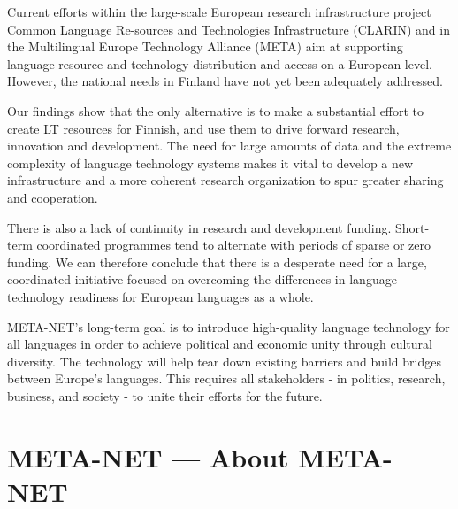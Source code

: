 \documentclass[]{../../metanetpaper}
\begin{document}
\begin{Parallel}[c]{70mm}{70mm}
{Current efforts within the large-scale European research
infrastructure project Common Language Re-sources and Technologies
Infrastructure (CLARIN) and in the Multilingual Europe Technology
Alliance (META) aim at supporting language resource and technology
distribution and access on a European level. However, the national
needs in Finland have not yet been adequately addressed.

Our findings show that the only alternative is to make a substantial
effort to create LT resources for Finnish, and use them to drive
forward research, innovation and development. The need for large
amounts of data and the extreme complexity of language technology
systems makes it vital to develop a new infrastructure and a more
coherent research organization to spur greater sharing and
cooperation.

There is also a lack of continuity in research and development
funding.  Short-term coordinated programmes tend to alternate with
periods of sparse or zero funding. We can therefore conclude that
there is a desperate need for a large, coordinated initiative focused
on overcoming the differences in language technology readiness for
European languages as a whole.

META-NET’s long-term goal is to introduce high-quality language
technology for all languages in order to achieve political and
economic unity through cultural diversity. The technology will help
tear down existing barriers and build bridges between Europe’s
languages. This requires all stakeholders - in politics, research,
business, and society - to unite their efforts for the future.
}

\ParallelPar

\section{META-NET --- About META-NET}

\end{Parallel}
\end{document}
